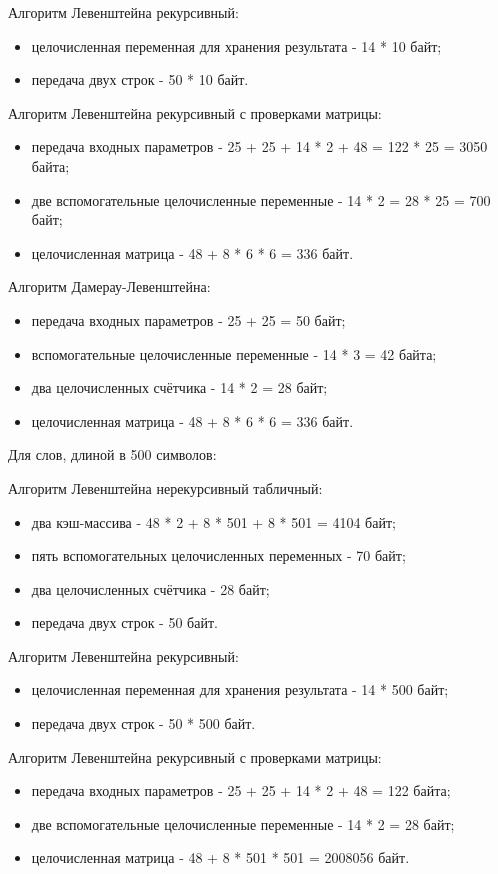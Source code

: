 Алгоритм Левенштейна рекурсивный:
\begin{itemize}
	\item целочисленная переменная для хранения результата - 14 * 10 байт;
	\item передача двух строк - 50 * 10 байт.
\end{itemize}

Алгоритм Левенштейна рекурсивный с проверками матрицы:
\begin{itemize}
	\item передача входных параметров - 25 + 25 + 14 * 2 + 48 = 122 * 25 = 3050 байта;
	\item две вспомогательные целочисленные переменные - 14 * 2 = 28 * 25 = 700 байт;
	\item целочисленная матрица - 48 + 8 * 6 * 6 = 336 байт.
\end{itemize}

Алгоритм Дамерау-Левенштейна:
\begin{itemize}
	\item передача входных параметров - 25 + 25 = 50 байт;
	\item вспомогательные целочисленные переменные - 14 * 3 = 42 байта;
	\item два целочисленных счётчика - 14 * 2 = 28 байт;
	\item целочисленная матрица - 48 + 8 * 6 * 6 = 336 байт.
\end{itemize}

Для слов, длиной в 500 символов:

Алгоритм Левенштейна нерекурсивный табличный:
\begin{itemize}
	\item два кэш-массива - 48 * 2 + 8 * 501 + 8 * 501 = 4104 байт;
	\item пять вспомогательных целочисленных переменных - 70 байт;
	\item два целочисленных счётчика - 28 байт;
	\item передача двух строк - 50 байт.
\end{itemize}

Алгоритм Левенштейна рекурсивный:
\begin{itemize}
	\item целочисленная переменная для хранения результата - 14 * 500 байт;
	\item передача двух строк - 50 * 500 байт.
\end{itemize}

Алгоритм Левенштейна рекурсивный с проверками матрицы:
\begin{itemize}
	\item передача входных параметров - 25 + 25 + 14 * 2 + 48 = 122 байта;
	\item две вспомогательные целочисленные переменные - 14 * 2 = 28 байт;
	\item целочисленная матрица - 48 + 8 * 501 * 501 = 2008056 байт.
\end{itemize}

